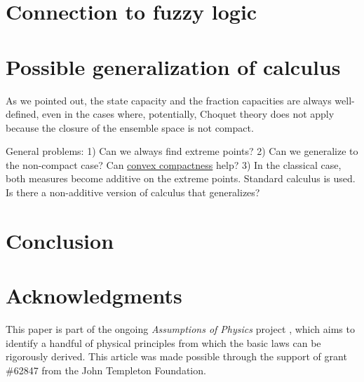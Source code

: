 \documentclass[10pt,twocolumn, nofootinbib]{revtex4-2}
\begin{document}
\section{Connection to fuzzy logic}



\section{Possible generalization of calculus}

As we pointed out, the state capacity and the fraction capacities are always well-defined, even in the cases where, potentially, Choquet theory does not apply because the closure of the ensemble space is not compact.

General problems:
1) Can we always find extreme points?
2) Can we generalize to the non-compact case? Can \href{https://en.wikipedia.org/wiki/Krein%E2%80%93Milman_theorem#convex_compactness}{convex compactness} help?
3) In the classical case, both measures become additive on the extreme points. Standard calculus is used. Is there a non-additive version of calculus that generalizes?

\section{Conclusion}



\section*{Acknowledgments}
This paper is part of the ongoing \textit{Assumptions of Physics} project \cite{aop-book}, which aims to identify a handful of physical principles from which the basic laws can be rigorously derived. This article was made possible through the support of grant \#62847 from the John Templeton Foundation.




\newcommand{\pj}[1] {\underbar{$#1$}}
\end{document}
